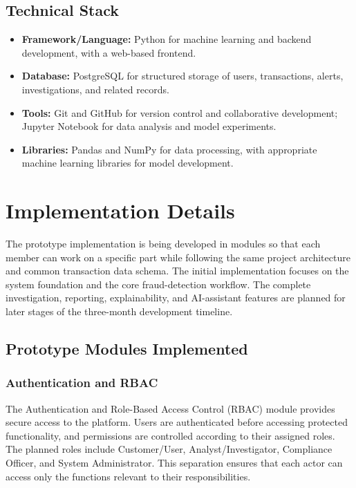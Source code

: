 \documentclass{tietreport}
\begin{document}
\subsection{Technical Stack}

\begin{itemize}
  \item \textbf{Framework/Language:} Python for machine learning and
    backend development, with a web-based frontend.
  \item \textbf{Database:} PostgreSQL for structured storage of users,
    transactions, alerts, investigations, and related records.
  \item \textbf{Tools:} Git and GitHub for version control and collaborative
    development; Jupyter Notebook for data analysis and model experiments.
  \item \textbf{Libraries:} Pandas and NumPy for data processing, with
    appropriate machine learning libraries for model development.
\end{itemize}

\section{Implementation Details}

The prototype implementation is being developed in modules so that each
member can work on a specific part while following the same project
architecture and common transaction data schema. The initial implementation
focuses on the system foundation and the core fraud-detection workflow.
The complete investigation, reporting, explainability, and AI-assistant
features are planned for later stages of the three-month development
timeline.

\subsection{Prototype Modules Implemented}

\subsubsection*{Authentication and RBAC}

The Authentication and Role-Based Access Control (RBAC) module provides
secure access to the platform. Users are authenticated before accessing
protected functionality, and permissions are controlled according to their
assigned roles. The planned roles include Customer/User, Analyst/Investigator,
Compliance Officer, and System Administrator. This separation ensures that
each actor can access only the functions relevant to their responsibilities.
\end{document}
